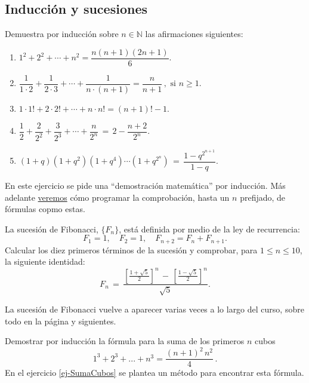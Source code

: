 \subsection{Inducci\'on y sucesiones}
\begin{ejer}
Demuestra por inducci\'on sobre $n\in\mathbb{N}$ las afirmaciones siguientes:
\label{rec}
\begin{enumerate}

\item $1^2+2^2+\cdots+n^2= \dfrac{n(n+1)(2n+1)}6.$

\item $\dfrac{1}{1\cdot 2}+\dfrac{1}{2\cdot 3}+\cdots+\dfrac{1}{n\cdot (n+1)} =
\dfrac{n}{n+1}\,,\text{ si }n\ge1.$
\item $1\cdot 1!+2\cdot 2!+\cdots +n\cdot n!=(n+1)!-1.$

\item $ \dfrac12+\dfrac2{2^2}+\dfrac3{2^3}+\cdots+ \dfrac n{2^n}\,=\,
2-\dfrac{n+2}{2^n}.$
\item $(1+q)(1+q^2)(1+q^4)\cdots (1+q^{2^n}) \,=\, \dfrac{1-q^{2^{n+1}}}{1-q}.$

\end{enumerate}

En este ejercicio se pide una ``demostraci\'on matem\'atica'' por inducci\'on. M\'as adelante \hyperref[induccion]{veremos} c\'omo programar  la comprobaci\'on, hasta un $n$ prefijado, de f\'ormulas copmo estas.


\end{ejer}





\begin{ejer}
La sucesión de Fibonacci, $\{F_n\}$, está definida por medio de la
ley de recurrencia:
$$
F_1=1,\quad F_2=1,\quad F_{n+2}=F_n+F_{n+1}.
$$
Calcular los diez primeros términos de la sucesión y comprobar, para $1\le n\le
10$,  la
siguiente identidad:
$$
F_n\,=\, \frac{\left[\frac{1+\sqrt5}2\right]^n\,-\,
\left[\frac{1-\sqrt5}2\right]^n} {\sqrt5}.
$$

La sucesi\'on de Fibonacci vuelve a aparecer varias veces a lo largo del curso,
sobre todo en la  p\'agina \pageref{fibon} y siguientes. 

\end{ejer}

\pagebreak[2]

\begin{ejer}\label{ej-DemoSumaCubos}
Demostrar por inducción la fórmula para la suma de los primeros $n$ cubos
$$
1^3+2^3+...+n^3=\frac{(n+1)^2\,n^2}{4}\,.
$$
En el ejercicio \ref{ej-SumaCubos} se plantea un método para encontrar esta
fórmula. 
\end{ejer}

